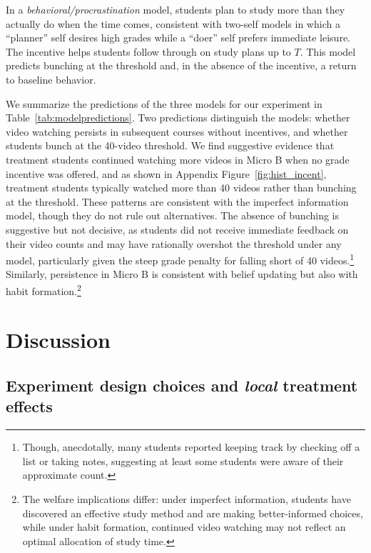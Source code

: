 In a \textit{behavioral/procrastination} model, students plan to study more than they actually do when the time comes, consistent with two-self models in which a ``planner'' self desires high grades while a ``doer'' self prefers immediate leisure.
The incentive helps students follow through on study plans up to $T$.
This model predicts bunching at the threshold and, in the absence of the incentive, a return to baseline behavior.

We summarize the predictions of the three models for our experiment in Table~\ref{tab:modelpredictions}.
Two predictions distinguish the models: whether video watching persists in subsequent courses without incentives, and whether students bunch at the 40-video threshold.
We find suggestive evidence that treatment students continued watching more videos in Micro B when no grade incentive was offered, and as shown in Appendix Figure~\ref{fig:hist_incent}, treatment students typically watched more than 40 videos rather than bunching at the threshold.
These patterns are consistent with the imperfect information model, though they do not rule out alternatives.
The absence of bunching is suggestive but not decisive, as students did not receive immediate feedback on their video counts and may have rationally overshot the threshold under any model, particularly given the steep grade penalty for falling short of 40 videos.\footnote{Though, anecdotally, many students reported keeping track by checking off a list or taking notes, suggesting at least some students were aware of their approximate count.}
Similarly, persistence in Micro B is consistent with belief updating but also with habit formation.\footnote{The welfare implications differ: under imperfect information, students have discovered an effective study method and are making better-informed choices, while under habit formation, continued video watching may not reflect an optimal allocation of study time.}



\section{Discussion} \label{sec:discussion}
\subsection{Experiment design choices and \textit{local} treatment effects} \label{subsec:lates_section}

